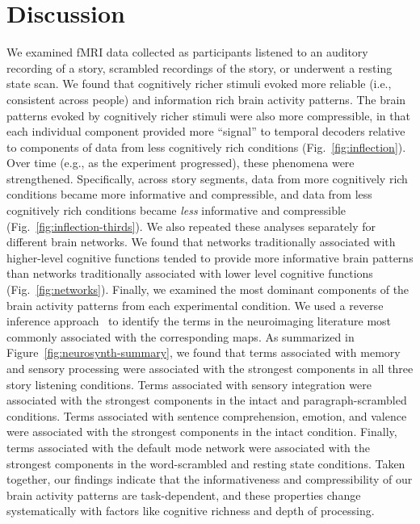 \documentclass[english, 11pt]{article}
\begin{document}
\section*{Discussion}

We examined fMRI data collected as participants listened to an auditory
recording of a story, scrambled recordings of the story, or underwent a resting
state scan. We found that cognitively richer stimuli evoked more reliable
(i.e., consistent across people) and information rich brain activity patterns.
The brain patterns evoked by cognitively richer stimuli were also more
compressible, in that each individual component provided more ``signal'' to
temporal decoders relative to components of data from less cognitively rich
conditions (Fig.~\ref{fig:inflection}). Over time (e.g., as the experiment
progressed), these phenomena were strengthened. Specifically, across story
segments, data from more cognitively rich conditions became more informative
and compressible, and data from less cognitively rich conditions became
\textit{less} informative and compressible (Fig.~\ref{fig:inflection-thirds}).
We also repeated these analyses separately for different brain networks. We
found that networks traditionally associated with higher-level cognitive
functions tended to provide more informative brain patterns than networks
traditionally associated with lower level cognitive functions
(Fig.~\ref{fig:networks}). Finally, we examined the most dominant components of
the brain activity patterns from each experimental condition. We used a reverse
inference approach~\citep{RubiEtal17} to identify the terms in the neuroimaging
literature most commonly associated with the corresponding maps. As summarized
in Figure~\ref{fig:neurosynth-summary}, we found that terms associated with memory and
sensory processing were associated with the strongest components in all three
story listening conditions. Terms associated with sensory integration were
associated with the strongest components in the intact and paragraph-scrambled
conditions. Terms associated with sentence comprehension, emotion, and valence
were associated with the strongest components in the intact condition. Finally,
terms associated with the default mode network were associated with the
strongest components in the word-scrambled and resting state conditions. Taken
together, our findings indicate that the informativeness and compressibility of
our brain activity patterns are task-dependent, and these properties change
systematically with factors like cognitive richness and depth of processing.
\end{document}

